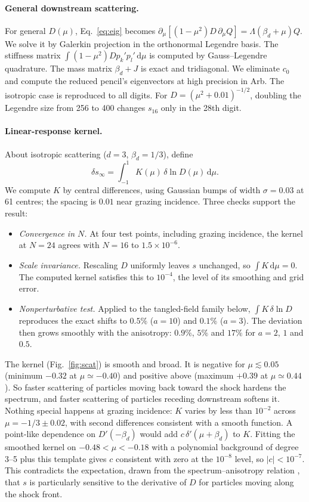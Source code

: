 \documentclass[aps,prd,twocolumn,superscriptaddress,nofootinbib,floatfix]{revtex4-2}
\newcommand{\sinf}{s_\infty}
\newcommand{\bd}{\beta_d}
\newcommand{\dd}{\mathrm{d}}
\begin{document}
\paragraph{General downstream scattering.}
For general $D(\mu)$, Eq.~\eqref{eq:eig} becomes $\partial_\mu[(1-\mu^2)D\,\partial_\mu Q]=\Lambda(\bd+\mu)Q$. We
solve it by Galerkin projection in the orthonormal Legendre basis. The stiffness matrix
$\int(1-\mu^2)Dp_k'p_l'\,\dd\mu$ is computed by Gauss--Legendre quadrature. The mass matrix $\bd+J$ is exact and
tridiagonal. We eliminate $c_0$ and compute the reduced pencil's eigenvectors at high precision in Arb. The
isotropic case is reproduced to all digits. For $D=(\mu^2+0.01)^{-1/2}$, doubling the Legendre size from 256 to 400
changes $s_{16}$ only in the 28th digit.

\paragraph{Linear-response kernel.}
About isotropic scattering ($d=3$, $\bd=1/3$), define
\begin{equation}
\delta\sinf=\int_{-1}^{1}K(\mu)\,\delta\ln D(\mu)\,\dd\mu .
\end{equation}
We compute $K$ by central differences, using Gaussian bumps of width $\sigma=0.03$ at 61 centres; the spacing is
$0.01$ near grazing incidence. Three checks support the result:
\begin{itemize}
\item \emph{Convergence in $N$.} At four test points, including grazing incidence, the kernel at $N=24$ agrees with $N=16$ to $1.5\times10^{-6}$.
\item \emph{Scale invariance.} Rescaling $D$ uniformly leaves $s$ unchanged, so $\int K\,\dd\mu=0$. The computed
  kernel satisfies this to $10^{-4}$, the level of its smoothing and grid error.
\item \emph{Nonperturbative test.} Applied to the tangled-field family below, $\int K\,\delta\ln D$ reproduces the
  exact shifts to $0.5\%$ ($a=10$) and $0.1\%$ ($a=3$). The deviation then grows smoothly with the anisotropy:
  $0.9\%$, $5\%$ and $17\%$ for $a=2$, $1$ and $0.5$.
\end{itemize}
The kernel (Fig.~\ref{fig:scat}) is smooth and broad. It is negative for $\mu\lesssim0.05$ (minimum $-0.32$ at
$\mu\simeq-0.40$) and positive above (maximum $+0.39$ at $\mu\simeq0.44$). So faster scattering of particles
moving back toward the shock hardens the spectrum, and faster scattering of particles receding downstream softens
it. Nothing special happens at grazing incidence: $K$ varies by less than $10^{-2}$ across $\mu=-1/3\pm0.02$, with
second differences consistent with a smooth function. A point-like dependence on $D'(-\bd)$ would add $c\,\delta'(\mu+\bd)$ to $K$. Fitting the
smoothed kernel on $-0.48<\mu<-0.18$ with a polynomial background of degree 3--5 plus this template gives $c$
consistent with zero at the $10^{-8}$ level, so $|c|<10^{-7}$. This contradicts the expectation, drawn from the
spectrum--anisotropy relation \cite{KeshetWaxman2005}, that $s$ is particularly sensitive to the derivative of $D$
for particles moving along the shock front.
\end{document}
